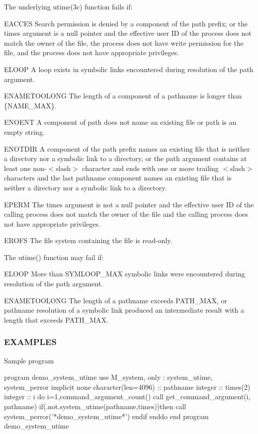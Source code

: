The underlying utime(3c) function fails if\+:

E\+A\+C\+C\+ES Search permission is denied by a component of the path prefix; or the times argument is a null pointer and the effective user ID of the process does not match the owner of the file, the process does not have write permission for the file, and the process does not have appropriate privileges.

E\+L\+O\+OP A loop exists in symbolic links encountered during resolution of the path argument.

E\+N\+A\+M\+E\+T\+O\+O\+L\+O\+NG The length of a component of a pathname is longer than \{N\+A\+M\+E\+\_\+\+M\+AX\}.

E\+N\+O\+E\+NT A component of path does not name an existing file or path is an empty string.

E\+N\+O\+T\+D\+IR A component of the path prefix names an existing file that is neither a directory nor a symbolic link to a directory, or the path argument contains at least one non-\/$<$slash$>$ character and ends with one or more trailing $<$slash$>$ characters and the last pathname component names an existing file that is neither a directory nor a symbolic link to a directory.

E\+P\+E\+RM The times argument is not a null pointer and the effective user ID of the calling process does not match the owner of the file and the calling process does not have appropriate privileges.

E\+R\+O\+FS The file system containing the file is read-\/only.

The utime() function may fail if\+: \begin{DoxyVerb} ELOOP  More than {SYMLOOP_MAX} symbolic links were encountered
        during resolution of the path argument.

 ENAMETOOLONG  The length of a pathname exceeds {PATH_MAX}, or
               pathname resolution of a symbolic link produced
               an intermediate result with a length that exceeds
               {PATH_MAX}.
\end{DoxyVerb}


\subsubsection*{E\+X\+A\+M\+P\+L\+ES}

\begin{DoxyVerb}  Sample program

   program demo_system_utime
   use M_system, only : system_utime, system_perror
   implicit none
   character(len=4096) :: pathname
   integer             :: times(2)
   integer             :: i
      do i=1,command_argument_count()
         call get_command_argument(i, pathname)
         if(.not.system_utime(pathname,times))then
            call system_perror('*demo_system_utime*')
         endif
      enddo
   end program demo_system_utime \end{DoxyVerb}
 

